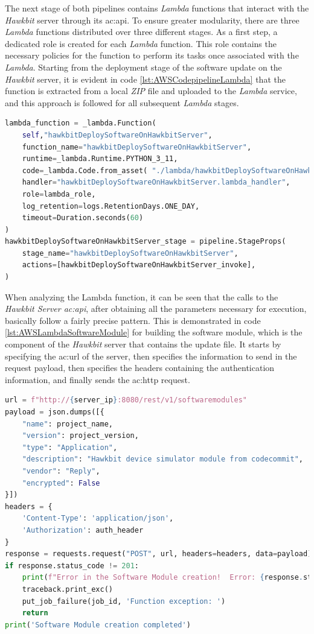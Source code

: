 The next stage of both pipelines contains \textit{Lambda} functions that interact with the \textit{Hawkbit} server through its \gls{ac:api}. To ensure greater modularity, there are three \textit{Lambda} functions distributed over three different stages. As a first step, a dedicated role is created for each \textit{Lambda} function. This role contains the necessary policies for the function to perform its tasks once associated with the \textit{Lambda}.
Starting from the deployment stage of the software update on the \textit{Hawkbit} server, it is evident in code \ref{lst:AWSCodepipelineLambda} that the function is extracted from a local \textit{ZIP} file and uploaded to the \textit{Lambda} service, and this approach is followed for all subsequent \textit{Lambda} stages.
\begin{lstlisting}[language=Python, caption={CDK Code for the deploy software on Hawkbit server Lambda creation}, label=lst:AWSCodepipelineLambda]
lambda_function = _lambda.Function(
    self,"hawkbitDeploySoftwareOnHawkbitServer",
    function_name="hawkbitDeploySoftwareOnHawkbitServer",
    runtime=_lambda.Runtime.PYTHON_3_11,
    code=_lambda.Code.from_asset( "./lambda/hawkbitDeploySoftwareOnHawkbitServer.zip"),
    handler="hawkbitDeploySoftwareOnHawkbitServer.lambda_handler",
    role=lambda_role,
    log_retention=logs.RetentionDays.ONE_DAY,
    timeout=Duration.seconds(60)
)
hawkbitDeploySoftwareOnHawkbitServer_stage = pipeline.StageProps(
    stage_name="hawkbitDeploySoftwareOnHawkbitServer",
    actions=[hawkbitDeploySoftwareOnHawkbitServer_invoke],
)
\end{lstlisting}

When analyzing the Lambda function, it can be seen that the calls to the \textit{Hawkbit Server \gls{ac:api}}, after obtaining all the parameters necessary for execution, basically follow a fairly precise pattern. This is demonstrated in code \ref{lst:AWSLambdaSoftwareModule} for building the software module, which is the component of the \textit{Hawkbit} server that contains the update file. It starts by specifying the \gls{ac:url} of the server, then specifies the information to send in the request payload, then specifies the headers containing the authentication information, and finally sends the \gls{ac:http} request.
\begin{lstlisting}[language=Python, caption={Lambda code for the software module creation}, label=lst:AWSLambdaSoftwareModule]
url = f"http://{server_ip}:8080/rest/v1/softwaremodules"
payload = json.dumps([{
    "name": project_name,
    "version": project_version,
    "type": "Application",
    "description": "Hawkbit device simulator module from codecommit",
    "vendor": "Reply",
    "encrypted": False
}])
headers = {
    'Content-Type': 'application/json',
    'Authorization': auth_header
}
response = requests.request("POST", url, headers=headers, data=payload)
if response.status_code != 201:
    print(f"Error in the Software Module creation!  Error: {response.status_code}")
    traceback.print_exc()
    put_job_failure(job_id, 'Function exception: ')
    return
print('Software Module creation completed')
\end{lstlisting}

